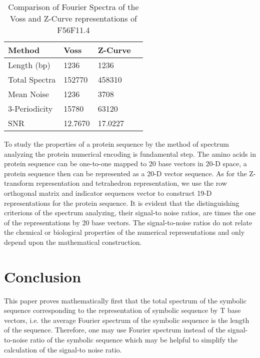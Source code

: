 \documentclass[preprint,authoryear,12pt]{elsarticle}
\begin{document}
\begin{table}[ht]
\caption{Comparison of Fourier Spectra of the Voss and Z-Curve representations of F56F11.4 } \centering \begin{tabular}{l l l l} \hline\hline Method & Voss & Z-Curve  \\ [0.5ex] \hline Length (bp) &  1236 & 1236 \\
    Total Spectra & 152770 & 458310 \\
    Mean Noise &  1236 & 3708 \\
    3-Periodicity & 15780 &  63120  \\
    SNR & 12.7670 &  17.0227  \\
\hline \end{tabular}
\label{table:nonlin} \end{table}

To study the properties of a protein sequence by the method of spectrum analyzing the protein numerical encoding is fundamental step. The amino acids in protein sequence can be one-to-one mapped to 20 base vectors in 20-D space, a protein sequence then can be represented as a 20-D vector sequence. As for the Z-transform representation and tetrahedron representation, we use the row orthogonal matrix and indicator sequences vector to construct 19-D representations for the protein sequence. It is evident that the distinguishing criterions of the spectrum analyzing, their signal-to noise ratios, are  times the one of the representations by 20 base vectors. The signal-to-noise ratios do not relate the chemical or biological properties of the numerical representations and only depend upon the mathematical construction.

\section{Conclusion}
This paper proves  mathematically first that the total spectrum of the symbolic sequence   corresponding to the representation of symbolic sequence by T base vectors, i.e. the average Fourier spectrum of the symbolic sequence is the length of the sequence. Therefore, one may use Fourier spectrum instead of the signal-to-noise ratio of the symbolic sequence which may be helpful to simplify the calculation of the signal-to noise ratio.
\end{document}
